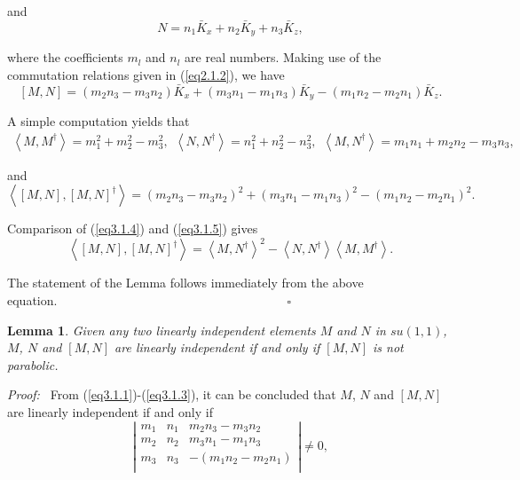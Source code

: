 \documentclass[onecolumn,showpacs,showkeys,preprintnumbers]{revtex4}
\newtheorem{lemma}[theorem]{Lemma}
\begin{document}
and\noindent\begin{equation}\label{eq3.1.2}N=n_1\bar{K}_x+n_2\bar{K}_y+n_3\bar{K}_z,
\end{equation}

\noindent where the coefficients $m_l$ and $n_l$ are real numbers.
Making use of the commutation relations given in
(\ref{eq2.1.2}), we have\noindent\begin{equation}\label{eq3.1.3}
  [M,N]=(m_2n_3-m_3n_2)\bar{K}_x+(m_3n_1-m_1n_3)\bar{K}_y-(m_1n_2-m_2n_1)\bar{K}_z.
\end{equation}

\noindent A simple computation yields that\noindent\begin{equation}\label{eq3.1.4}\begin{array}{l}
   \left<M,M^{\dag}\right>=m_1^2+m_2^2-m_3^2,~~
   \left<N,N^{\dag}\right>=n_1^2+n_2^2-n_3^2,~~
   \left<M,N^{\dag}\right>=m_1n_1+m_2n_2-m_3n_3,
\end{array}
\end{equation}

\noindent and\noindent\begin{equation}\label{eq3.1.5}\left<[M,N],[M,N]^\dag\right>=(m_2n_3-m_3n_2)^2+(m_3n_1-m_1n_3)^2-(m_1n_2-m_2n_1)^2.
\end{equation}

\noindent Comparison of (\ref{eq3.1.4}) and (\ref{eq3.1.5}) gives\noindent\begin{equation}\label{eq3.1.6}
\left<[M,N],[M,N]^{\dag}\right>=\left<M,N^{\dag}\right>^2-\left<N,N^{\dag}\right>\left<M,M^{\dag}\right>.
\end{equation}

\noindent The statement of the Lemma follows immediately from the
above equation.~~~~~~~~~~~~~~~~~~~~~~~~~~~~~~~~~~~~~$\square$

\noindent\begin{lemma}\label{lemma3.1.2}Given any two linearly independent elements $M$ and $N$ in
$su(1,1)$, $M$, $N$ and $[M,N]$ are linearly independent if and
only if $[M,N]$ is not parabolic.
\end{lemma}

{\it{Proof:~}} From (\ref{eq3.1.1})-(\ref{eq3.1.3}), it can be
concluded that $M$, $N$ and $[M,N]$ are linearly
independent if and only if\noindent\begin{equation}\label{eq3.1.7}
\left|\begin{array}{ccc}
  m_1 & n_1 & m_2n_3-m_3n_2 \\
  m_2 & n_2 & m_3n_1-m_1n_3 \\
  m_3 & n_3 & -(m_1n_2-m_2n_1)\\
\end{array}\right|\neq0,
\end{equation}
\end{document}
